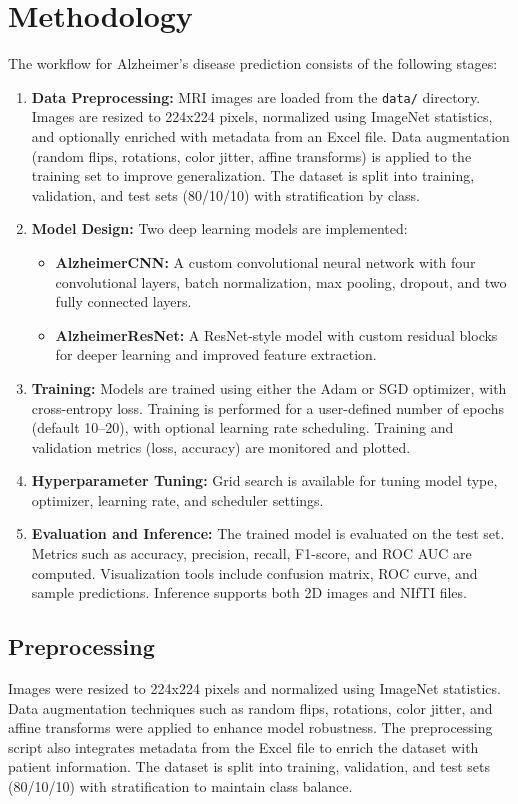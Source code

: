 \documentclass{article}
\begin{document}
\section{Methodology}
The workflow for Alzheimer's disease prediction consists of the following stages:
\begin{enumerate}
    \item \textbf{Data Preprocessing:} MRI images are loaded from the \texttt{data/} directory. Images are resized to 224x224 pixels, normalized using ImageNet statistics, and optionally enriched with metadata from an Excel file. Data augmentation (random flips, rotations, color jitter, affine transforms) is applied to the training set to improve generalization. The dataset is split into training, validation, and test sets (80/10/10) with stratification by class.
    \item \textbf{Model Design:} Two deep learning models are implemented:
    \begin{itemize}
        \item \textbf{AlzheimerCNN:} A custom convolutional neural network with four convolutional layers, batch normalization, max pooling, dropout, and two fully connected layers.
        \item \textbf{AlzheimerResNet:} A ResNet-style model with custom residual blocks for deeper learning and improved feature extraction.
    \end{itemize}
    \item \textbf{Training:} Models are trained using either the Adam or SGD optimizer, with cross-entropy loss. Training is performed for a user-defined number of epochs (default 10--20), with optional learning rate scheduling. Training and validation metrics (loss, accuracy) are monitored and plotted.
    \item \textbf{Hyperparameter Tuning:} Grid search is available for tuning model type, optimizer, learning rate, and scheduler settings.
    \item \textbf{Evaluation and Inference:} The trained model is evaluated on the test set. Metrics such as accuracy, precision, recall, F1-score, and ROC AUC are computed. Visualization tools include confusion matrix, ROC curve, and sample predictions. Inference supports both 2D images and NIfTI files.
\end{enumerate}

\subsection{Preprocessing}
Images were resized to 224x224 pixels and normalized using ImageNet statistics. Data augmentation techniques such as random flips, rotations, color jitter, and affine transforms were applied to enhance model robustness. The preprocessing script also integrates metadata from the Excel file to enrich the dataset with patient information. The dataset is split into training, validation, and test sets (80/10/10) with stratification to maintain class balance.
\end{document}
